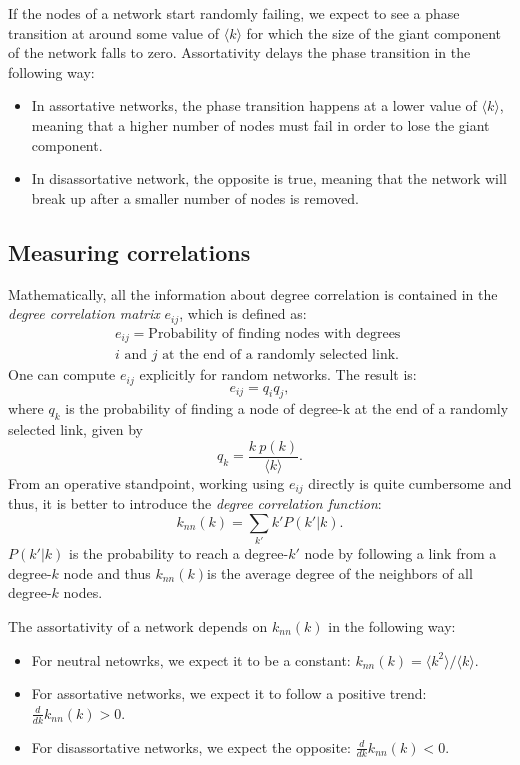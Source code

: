 If the nodes of a network start randomly failing, we expect to see a phase transition at around some value of $\langle k \rangle$ for which the size of the giant component of the network falls to zero. Assortativity delays the phase transition in the following way:
\begin{itemize}
    \item In assortative networks, the phase transition happens at a lower value of $\langle k \rangle$, meaning that a higher number of nodes must fail in order to lose the giant component.
    \item In disassortative network, the opposite is true, meaning that the network will break up after a smaller number of nodes is removed.
\end{itemize}

\subsection{Measuring correlations}
Mathematically, all the information about degree correlation is contained in the \emph{degree correlation matrix} $e_{ij}$, which is defined as:
\begin{align*}
    e_{ij} = \text{Probability of finding nodes with degrees }\\ i \text{ and } j \text{ at the end of a randomly selected link.}
\end{align*}
One can compute \cite{barabasi} $e_{ij}$ explicitly for random networks. The result is:
\begin{equation*}
    e_{ij} = q_i q_j,
\end{equation*}
where $q_k$ is the probability of finding a node of degree-k at the end of a randomly selected link, given by
\begin{equation*}
    q_k = \frac{k\ p(k)} {\langle k \rangle}.
\end{equation*}
From an operative standpoint, working using $e_{ij}$ directly is quite cumbersome and thus, it is better to introduce the \emph{degree correlation function}:
\begin{equation*}
    k_{nn}(k) = \sum_{k'}k'P(k'|k).
\end{equation*}
$P(k'|k)$ is the probability to reach a degree-$k'$ node by following a link from a degree-$k$ node and thus $k_{nn}(k)$is the average degree of the neighbors of all degree-$k$ nodes.

The assortativity of a network depends on $k_{nn}(k)$ in the following way:
\begin{itemize}
    \item For neutral netowrks, we expect it to be a constant: $k_{nn}(k) = \langle k^2\rangle / \langle k\rangle$.
    \item For assortative networks, we expect it to follow a positive trend: $\frac d {dk} k_{nn}(k) > 0$.
    \item For disassortative networks, we expect the opposite: $\frac d {dk}k_{nn}(k) < 0$.
\end{itemize}

